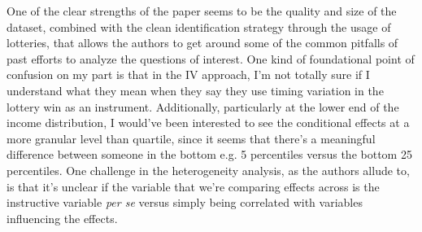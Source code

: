 \documentclass[11pt]{article}
\begin{document}
One of the clear strengths of the paper 
seems to be the quality and size of the dataset,
combined with the clean identification 
strategy through the usage of lotteries, that allows the authors 
to get around some of the common pitfalls 
of past efforts to analyze the questions of interest.
One kind of foundational point of confusion on my part is 
that in the IV approach, I'm not 
totally sure if I understand what they mean when they 
say they use 
timing variation in the lottery win as an instrument.
Additionally, particularly at the lower end of the income distribution,
I would've been interested to see the conditional 
effects at a more granular level than quartile, since 
it seems that there's a meaningful difference between someone 
in the bottom e.g. 5 percentiles versus the bottom 25 percentiles.
One challenge in the heterogeneity analysis, as the authors allude to,
is that it's unclear if the variable that we're comparing 
effects across is the instructive variable \emph{per se}
versus simply being correlated with variables influencing
the effects.  
\end{document}
